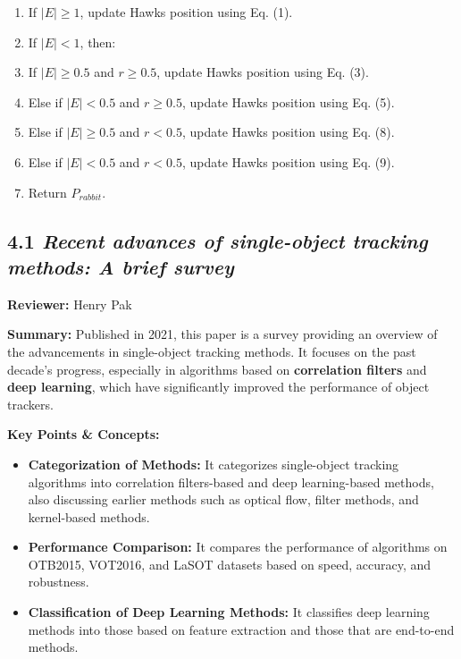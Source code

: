 \documentclass{article}
\begin{document}
\begin{itemize}
\begin{enumerate}
      \item If \(|E| \geq 1\), update Hawks position using Eq. (1). 
      \item If \(|E| < 1\), then:  
      \item If \(|E| \geq 0.5\) and \(r \geq 0.5\), update Hawks position using Eq. (3). 
      \item Else if \(|E| < 0.5\) and \(r \geq 0.5\), update Hawks position using Eq. (5).  
      \item Else if \(|E| \geq 0.5\) and \(r < 0.5\), update Hawks position using Eq. (8).  
      \item Else if \(|E| < 0.5\) and \(r < 0.5\), update Hawks position using Eq. (9).  
      \item Return \(P_{\textit{rabbit}}\).  
    \end{enumerate}
\end{itemize}

\subsection*{4.1 \textit{Recent advances of single-object tracking methods: A brief survey}}

\hspace*{\parindent}\textbf{Reviewer:} Henry Pak

\vspace{0.3cm}

\textbf{Summary:} Published in 2021, this paper is a survey providing an overview of the advancements in single-object tracking methods. It focuses on the past decade's progress, especially in algorithms based on \textbf{correlation filters} and \textbf{deep learning}, which have significantly improved the performance of object trackers.

\vspace{0.3cm}

\textbf{Key Points \& Concepts:}
\begin{itemize}
  \item \textbf{Categorization of Methods:} It categorizes single-object tracking algorithms into correlation filters-based and deep learning-based methods, also discussing earlier methods such as optical flow, filter methods, and kernel-based methods.
  \item \textbf{Performance Comparison:} It compares the performance of algorithms on OTB2015, VOT2016, and LaSOT datasets based on speed, accuracy, and robustness.
  \item \textbf{Classification of Deep Learning Methods:} It classifies deep learning methods into those based on feature extraction and those that are end-to-end methods.
\end{itemize}
\end{document}
